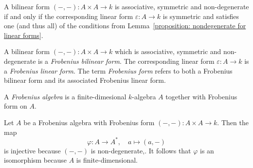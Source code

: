 \begin{corollary}
  A bilinear form $(-,-) \colon A \times A \to k$ is associative, symmetric and non-degenerate if and only if the corresponding linear form $\varepsilon \colon A \to k$ is symmetric and satisfies one (and thus all) of the conditions from Lemma~\ref{proposition: nondegenerate for linear forms}.
\end{corollary}


\begin{definition}
  A bilinear form $(-,-) \colon A \times A \to k$ which is associative, symmetric and non-degenerate is a \emph{Frobenius bilinear form}.
  The corresponding linear form $\varepsilon \colon A \to k$ is a \emph{Frobenius linear form}.
  The term \emph{Frobenius form} refers to both a Frobenius bilinear form and its associated Frobenius linear form.
\end{definition}


\begin{definition}
  A \emph{Frobenius algebra} is a finite-dimesional $k$-algebra $A$ together with Frobenius form on $A$.
\end{definition}


\begin{remark}
  Let $A$ be a Frobenius algebra with Frobenius form $(-,-) \colon A \times A \to k$.
  Then the map
  \[
            \varphi
    \colon  A
    \to     A^*,
    \quad   a
    \mapsto (a,-)
  \]
  is injective because $(-,-)$ is non-degenerate,.
  It follows that $\varphi$ is an isomorphism because $A$ is finite-dimensional.
\end{remark}


